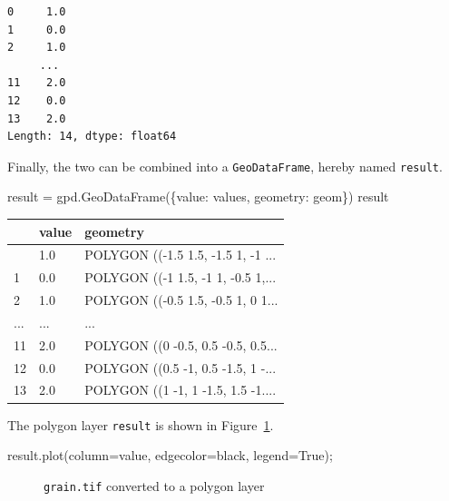 \documentclass[
  letterpaper,
]{krantz}
\newenvironment{Shaded}{\begin{snugshade}}{\end{snugshade}}
\newcommand{\NormalTok}[1]{\textcolor[rgb]{0.00,0.23,0.31}{#1}}
\newcommand{\OperatorTok}[1]{\textcolor[rgb]{0.37,0.37,0.37}{#1}}
\newcommand{\StringTok}[1]{\textcolor[rgb]{0.13,0.47,0.30}{#1}}
\newcommand{\VariableTok}[1]{\textcolor[rgb]{0.07,0.07,0.07}{#1}}
\begin{document}
\begin{verbatim}
0     1.0
1     0.0
2     1.0
     ... 
11    2.0
12    0.0
13    2.0
Length: 14, dtype: float64
\end{verbatim}

Finally, the two can be combined into a \texttt{GeoDataFrame}, hereby
named \texttt{result}.

\begin{Shaded}
\begin{Highlighting}[]
\NormalTok{result }\OperatorTok{=}\NormalTok{ gpd.GeoDataFrame(\{}\StringTok{\textquotesingle{}value\textquotesingle{}}\NormalTok{: values, }\StringTok{\textquotesingle{}geometry\textquotesingle{}}\NormalTok{: geom\})}
\NormalTok{result}
\end{Highlighting}
\end{Shaded}

\begin{longtable}[]{@{}lll@{}}
\toprule\noalign{}
& value & geometry \\
\midrule\noalign{}
\endhead
\bottomrule\noalign{}
\endlastfoot
0 & 1.0 & POLYGON ((-1.5 1.5, -1.5 1, -1 ... \\
1 & 0.0 & POLYGON ((-1 1.5, -1 1, -0.5 1,... \\
2 & 1.0 & POLYGON ((-0.5 1.5, -0.5 1, 0 1... \\
... & ... & ... \\
11 & 2.0 & POLYGON ((0 -0.5, 0.5 -0.5, 0.5... \\
12 & 0.0 & POLYGON ((0.5 -1, 0.5 -1.5, 1 -... \\
13 & 2.0 & POLYGON ((1 -1, 1 -1.5, 1.5 -1.... \\
\end{longtable}

The polygon layer \texttt{result} is shown in
Figure~\ref{fig-raster-to-polygons}.

\begin{Shaded}
\begin{Highlighting}[]
\NormalTok{result.plot(column}\OperatorTok{=}\StringTok{\textquotesingle{}value\textquotesingle{}}\NormalTok{, edgecolor}\OperatorTok{=}\StringTok{\textquotesingle{}black\textquotesingle{}}\NormalTok{, legend}\OperatorTok{=}\VariableTok{True}\NormalTok{)}\OperatorTok{;}
\end{Highlighting}
\end{Shaded}

\begin{figure}[H]


\caption{\label{fig-raster-to-polygons}\texttt{grain.tif} converted to a
polygon layer}

\end{figure}%
\end{document}
